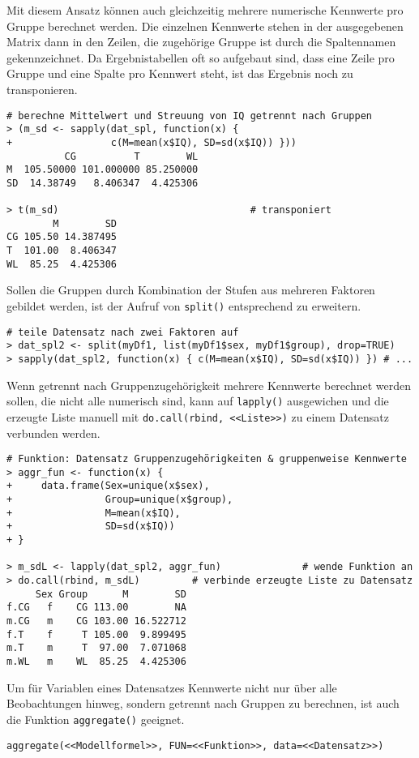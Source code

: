 Mit diesem Ansatz können auch gleichzeitig mehrere numerische Kennwerte pro Gruppe berechnet werden. Die einzelnen Kennwerte stehen in der ausgegebenen Matrix dann in den Zeilen, die zugehörige Gruppe ist durch die Spaltennamen gekennzeichnet. Da Ergebnistabellen oft so aufgebaut sind, dass eine Zeile pro Gruppe und eine Spalte pro Kennwert steht, ist das Ergebnis noch zu transponieren.
\begin{lstlisting}
# berechne Mittelwert und Streuung von IQ getrennt nach Gruppen
> (m_sd <- sapply(dat_spl, function(x) {
+                 c(M=mean(x$IQ), SD=sd(x$IQ)) }))
          CG          T        WL
M  105.50000 101.000000 85.250000
SD  14.38749   8.406347  4.425306

> t(m_sd)                                 # transponiert
        M        SD
CG 105.50 14.387495
T  101.00  8.406347
WL  85.25  4.425306
\end{lstlisting}

Sollen die Gruppen durch Kombination der Stufen aus mehreren Faktoren gebildet werden, ist der Aufruf von \lstinline!split()! entsprechend zu erweitern.
\begin{lstlisting}
# teile Datensatz nach zwei Faktoren auf
> dat_spl2 <- split(myDf1, list(myDf1$sex, myDf1$group), drop=TRUE)
> sapply(dat_spl2, function(x) { c(M=mean(x$IQ), SD=sd(x$IQ)) }) # ...
\end{lstlisting}

Wenn getrennt nach Gruppenzugehörigkeit mehrere Kennwerte berechnet werden sollen, die nicht alle numerisch sind, kann auf \lstinline!lapply()! ausgewichen und die erzeugte Liste manuell mit \lstinline!do.call(rbind, <<Liste>>)! zu einem Datensatz verbunden werden.
\begin{lstlisting}
# Funktion: Datensatz Gruppenzugehörigkeiten & gruppenweise Kennwerte
> aggr_fun <- function(x) {
+     data.frame(Sex=unique(x$sex),
+                Group=unique(x$group),
+                M=mean(x$IQ),
+                SD=sd(x$IQ))
+ }

> m_sdL <- lapply(dat_spl2, aggr_fun)              # wende Funktion an
> do.call(rbind, m_sdL)         # verbinde erzeugte Liste zu Datensatz
     Sex Group      M        SD
f.CG   f    CG 113.00        NA
m.CG   m    CG 103.00 16.522712
f.T    f     T 105.00  9.899495
m.T    m     T  97.00  7.071068
m.WL   m    WL  85.25  4.425306
\end{lstlisting}

Um für Variablen eines Datensatzes Kennwerte nicht nur über alle Beobachtungen hinweg, sondern getrennt nach Gruppen zu berechnen, ist auch die Funktion \lstinline!aggregate()! geeignet.
\begin{lstlisting}
aggregate(<<Modellformel>>, FUN=<<Funktion>>, data=<<Datensatz>>)
\end{lstlisting}

